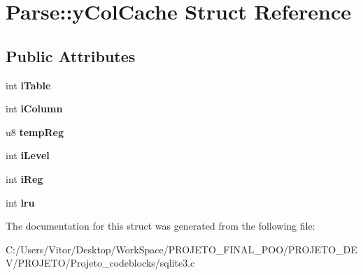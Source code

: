 \hypertarget{struct_parse_1_1y_col_cache}{\section{Parse\-:\-:y\-Col\-Cache Struct Reference}
\label{struct_parse_1_1y_col_cache}
}
\subsection*{Public Attributes}
\begin{DoxyCompactItemize}
\item 
\hypertarget{struct_parse_1_1y_col_cache_a7d99a4e00555cb0ff7fb3990bb7b549e}{int {\bfseries i\-Table}}\label{struct_parse_1_1y_col_cache_a7d99a4e00555cb0ff7fb3990bb7b549e}

\item 
\hypertarget{struct_parse_1_1y_col_cache_a67bdb189ef88aca5fc30b551da9a0f90}{int {\bfseries i\-Column}}\label{struct_parse_1_1y_col_cache_a67bdb189ef88aca5fc30b551da9a0f90}

\item 
\hypertarget{struct_parse_1_1y_col_cache_a61561cab1ce2e1914083777ae84c8fe8}{u8 {\bfseries temp\-Reg}}\label{struct_parse_1_1y_col_cache_a61561cab1ce2e1914083777ae84c8fe8}

\item 
\hypertarget{struct_parse_1_1y_col_cache_a656ea77cf538db00249221de58fd9066}{int {\bfseries i\-Level}}\label{struct_parse_1_1y_col_cache_a656ea77cf538db00249221de58fd9066}

\item 
\hypertarget{struct_parse_1_1y_col_cache_aadb47e545234142bd1e9ca4803953ab0}{int {\bfseries i\-Reg}}\label{struct_parse_1_1y_col_cache_aadb47e545234142bd1e9ca4803953ab0}

\item 
\hypertarget{struct_parse_1_1y_col_cache_ac163bb2b692f3037054f92294322f999}{int {\bfseries lru}}\label{struct_parse_1_1y_col_cache_ac163bb2b692f3037054f92294322f999}

\end{DoxyCompactItemize}


The documentation for this struct was generated from the following file\-:\begin{DoxyCompactItemize}
\item 
C\-:/\-Users/\-Vitor/\-Desktop/\-Work\-Space/\-P\-R\-O\-J\-E\-T\-O\-\_\-\-F\-I\-N\-A\-L\-\_\-\-P\-O\-O/\-P\-R\-O\-J\-E\-T\-O\-\_\-\-D\-E\-V/\-P\-R\-O\-J\-E\-T\-O/\-Projeto\-\_\-codeblocks/sqlite3.\-c\end{DoxyCompactItemize}
